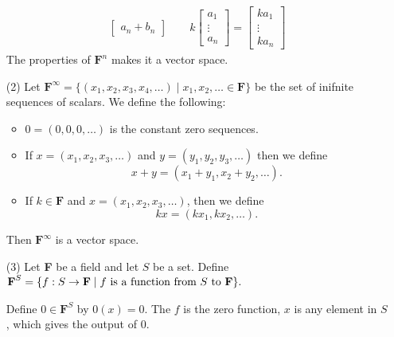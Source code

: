 \documentclass[11pt]{article}
\begin{document}
\begin{enumerate}
\begin{align*}
\begin{bmatrix}
                                                a_n + b_n 
                                            \end{bmatrix} \qquad
            k \begin{bmatrix}
                a_1    \\
                \vdots \\
                a_n
              \end{bmatrix} = \begin{bmatrix}
                  k a_1  \\
                  \vdots \\
                  k a_n
              \end{bmatrix}
        \end{align*}
        The properties of \(\textbf{F}^n\) makes it a vector space. 

        \item[(2)] Let \(\textbf{F}^{\infty} = \{(x_1,x_2,x_3,x_4, \dots) \mid x_1,x_2,\dots \in \textbf{F}\}\) be the set of inifnite sequences of scalars. We define the following:
        \begin{itemize}
            \item \(0 = (0,0,0,\dots)\) is the constant zero sequences.
            \item If \(x = (x_1, x_2, x_3, \dots)\) and \(y = (y_1,y_2,y_3, \dots)\) then we define \[x + y = (x_1 + y_1, x_2 + y_2, \dots).\]
            \item If \(k \in \textbf{F}\) and \(x = (x_1,x_2,x_3, \dots)\), then we define \[kx = (kx_1, kx_2, \dots).\]
        \end{itemize}
        Then \(\textbf{F}^{\infty}\) is a vector space.  

        \pagebreak

        \item[(3)] Let \textbf{F} be a field and let $S$ be a set. Define \(\textbf{F}^{S} = \{f : S \rightarrow \textbf{F} \mid \text{$f$ is a function from $S$ to \textbf{F}}\}.\)
        
        \vspace{1em}

        Define \(0 \in \textbf{F}^{S}\) by \(0(x) = 0\). The $f$ is the zero function, $x$ is any element in $S$, which gives the output of 0. 

        \vspace{1em}


\end{enumerate}
\end{document}
